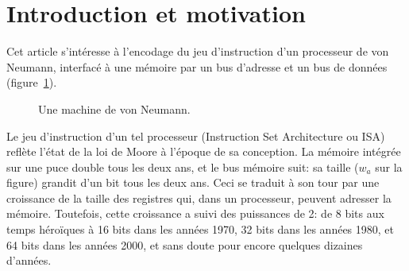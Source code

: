 \documentclass[architecture]{compas2018}
\begin{document}
\section{Introduction et motivation}
Cet article s'intéresse à l'encodage du jeu d'instruction d'un processeur de von Neumann, interfacé à une mémoire par un bus d'adresse et un bus de données  (figure~\ref{fig:mvn}).

\begin{figure}[b]
  \begin{center}
    \figVonNeumann
  \end{center}
  \caption{Une machine de von Neumann.}
  \label{fig:mvn} 
\end{figure}

Le jeu d'instruction d'un tel processeur (Instruction Set Architecture ou ISA) reflète l'état de la loi de Moore à l'époque de sa conception.
La mémoire intégrée sur une puce double tous les deux ans, et le bus mémoire suit: sa taille ($w_a$ sur la figure) grandit     d'un bit tous les deux ans.
Ceci se traduit à son tour par une croissance de la taille des registres qui, dans un processeur, peuvent adresser la mémoire.
Toutefois, cette croissance a suivi des puissances de 2: de 8 bits aux temps héroïques à 16 bits dans les années 1970, 32 bits dans les années 1980, et 64 bits dans les années 2000, et sans doute pour encore quelques dizaines d'années.

\iffalse %
La croissance du bus de données a suivi avec du retard, pour plusieurs raisons.
La première est que la loi de Moore doit aussi fournir assez de transistors au processeur pour calculer sur des données de plus en plus grandes.
Mais la complexité des principales opérations d'un processeur travaillant sur $n$ bits est en $n$, en $n\log n$ ou au pire en $n^2$: si l'on a pu être à l'étroit jusque dans les années 90 pour construire un processeur qui peut calculer sur des adresses mémoires, ce n'est plus le cas depuis.
La seconde raison est que les ordinateurs servent beaucoup à travailler sur du texte, donc des octets.
On a donc vu des processeurs très populaires 8/16 bits, c'est à dire $w_d=8$ et  $w_a = 16$: les z80, 6502, 8088; des processeurs 16/32 bits (68000, 80286 à 486); et même une variante 8/32 bits, le 68008. Puis l'industrie a convergé vers 32/32 avec l'arrivée des processeurs RISC  (SPARC,  ARM et Power)  puis et 64/64 avec AMD64 et ARM64.
Ainsi,  
De nos jours, les processeurs ont des registres de plusieurs centaines de bits (AMD64 SSE* puis AVX*, ARM Neon), encore une fois parce que la loi de Moore le permet.
Mais ces registres sont des vecteurs de données d'au plus 64 bits.
\fi
\end{document}
